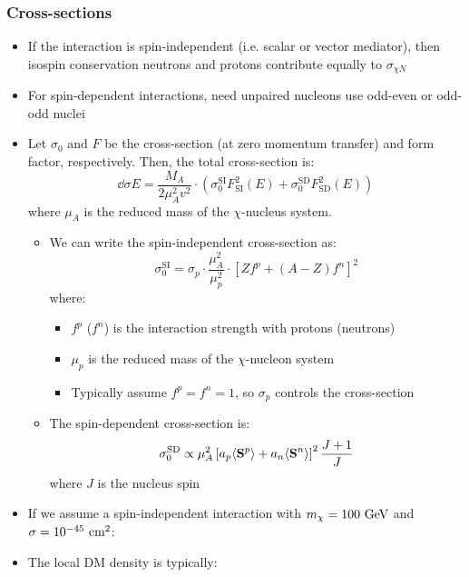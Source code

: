 \subsubsection{Cross-sections}
\begin{itemize}
  \item If the interaction is spin-independent (i.e. scalar or vector mediator), then isospin conservation \thus neutrons and protons contribute equally to $\sigma_{\chi N}$
  \item For spin-dependent interactions, need unpaired nucleons \thus use odd-even or odd-odd nuclei
  \item Let $\sigma_0$ and $F$ be the cross-section (at zero momentum transfer) and form factor, respectively. Then, the total cross-section is:
  \begin{equation}
    \dd{\sigma}{E} = \frac{M_A}{2\mu^2_A v^2} \cdot \left(\sigma_0^\text{SI} F_\text{SI}^2(E)+\sigma_0^\text{SD} F_\text{SD}^2(E)\right)
  \end{equation}
  where $\mu_A$ is the reduced mass of the $\chi$-nucleus system.
  \begin{itemize}
    \item We can write the spin-independent cross-section as:
    \begin{equation}
      \sigma_0^\text{SI} = \sigma_p \cdot \frac{\mu_A^2}{\mu_p^2} \cdot \left[Z f^p + (A-Z) f^n\right]^2
    \end{equation}
    where:
    \begin{itemize}
      \item $f^p$ ($f^n$) is the interaction strength with protons (neutrons) 
      \item $\mu_p$ is the reduced mass of the $\chi$-nucleon system
      \item Typically assume $f^p = f^n = 1$, so $\sigma_p$ controls the cross-section
    \end{itemize}
    \item The spin-dependent cross-section is:
    \begin{equation}
      \sigma_0^\text{SD} \propto  \mu_A^2 \left[a_p \langle \mathbf{S}^p \rangle + a_n \langle \mathbf{S}^n \rangle\right]^2 \frac{J+1}{J}
    \end{equation}
    where $J$ is the nucleus spin
  \end{itemize}
  \item If we assume a spin-independent interaction with $m_\chi = 100~\text{GeV}$ and $\sigma = 10^{-45}~\text{cm}^2$:
  \item The local DM density is typically:

\end{itemize}
